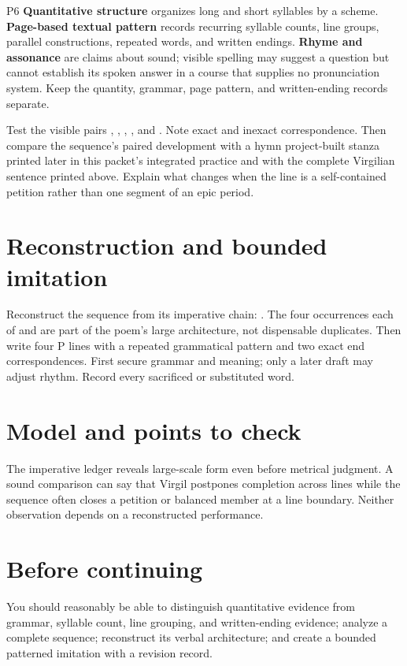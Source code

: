 \begin{courseunit}{P6}
\textbf{Quantitative structure} organizes long and short syllables by a scheme.
\textbf{Page-based textual pattern} records recurring syllable counts, line
groups, parallel constructions, repeated words, and written endings.
\textbf{Rhyme and assonance} are claims about sound; visible spelling may
suggest a question but cannot establish its spoken answer in a course that
supplies no pronunciation system. Keep the quantity, grammar, page pattern,
and written-ending records separate.

Test the visible pairs ,
, ,
, and . Note exact and inexact
correspondence. Then compare the sequence's paired development with a hymn
project-built stanza printed later in this packet's integrated practice and
with the complete Virgilian sentence printed above. Explain what changes when
the line is a self-contained petition rather than one segment of an epic
period.

\section{Reconstruction and bounded imitation}

Reconstruct the sequence from its imperative chain:
. The four occurrences each of
 and  are part of the poem's large architecture, not
dispensable duplicates. Then write four P lines with a repeated grammatical
pattern and two exact end correspondences. First secure grammar and meaning;
only a later draft may adjust rhythm. Record every sacrificed or substituted
word.

\ifsolutions
\section{Model and points to check}
The imperative ledger reveals large-scale form even before metrical judgment.
A sound comparison can say that Virgil postpones completion across lines while
the sequence often closes a petition or balanced member at a line boundary.
Neither observation depends on a reconstructed performance.
\else
\section{Before continuing}
You should reasonably be able to distinguish quantitative evidence from
grammar, syllable count, line grouping, and written-ending evidence; analyze a
complete sequence; reconstruct its verbal architecture; and create a bounded
patterned imitation with a revision record.
\fi
\end{courseunit}


